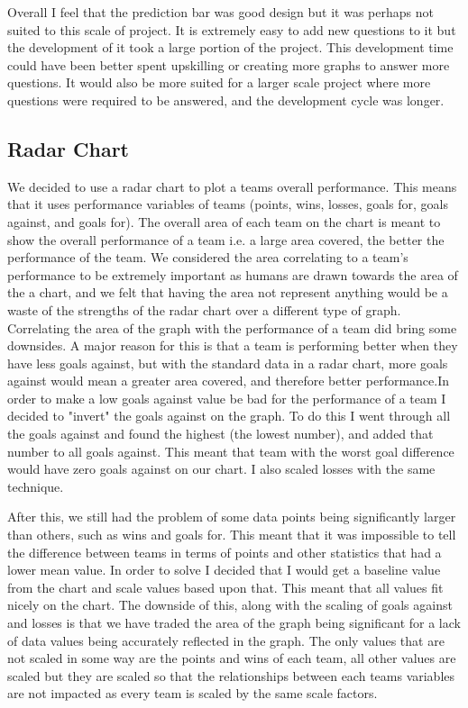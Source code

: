 \documentclass[10pt, journal]{IEEEtran}
\begin{document}
Overall I feel that the prediction bar was good design but it was perhaps not suited to this scale of project. It is extremely easy to add new questions to it but the development of it took a large portion of the project. This development time could have been better spent upskilling or creating more graphs to answer more questions. It would also be more suited for a larger scale project where more questions were required to be answered, and the development cycle was longer.

\subsection{Radar Chart}
We decided to use a radar chart to plot a teams overall performance. This means that it uses performance variables of teams (points, wins, losses, goals for, goals against, and goals for). The overall area of each team on the chart is meant to show the overall performance of a team i.e. a large area covered, the better the performance of the team. We considered the area correlating to a team's performance to be extremely important as humans are drawn towards the area of the a chart, and we felt that having the area not represent anything would be a waste of the strengths of the radar chart over a different type of graph. Correlating the area of the graph with the performance of a team did bring some downsides. A major reason for this is that a team is performing better when they have less goals against, but with the standard data in a radar chart, more goals against would mean a greater area covered, and therefore better performance.In order to make a low goals against value be bad for the performance of a team I decided to "invert" the goals against on the graph. To do this I went through all the goals against and found the highest (the lowest number), and added that number to all goals against. This meant that team with the worst goal difference would have zero goals against on our chart. I also scaled losses with the same technique.

After this, we still had the problem of some data points being significantly larger than others, such as wins and goals for. This meant that it was impossible to tell the difference between teams in terms of points and other statistics that had a lower mean value. In order to solve I decided that I would get a baseline value from the chart and scale values based upon that. This meant that all values fit nicely on the chart. The downside of this, along with the scaling of goals against and losses is that we have traded the area of the graph being significant for a lack of data values being accurately reflected in the graph. The only values that are not scaled in some way are the points and wins of each team, all other values are scaled but they are scaled so that the relationships between each teams variables are not impacted as every team is scaled by the same scale factors.
\end{document}
